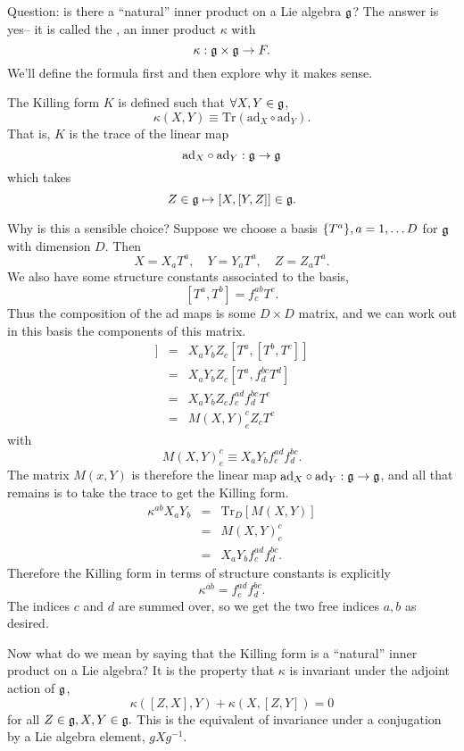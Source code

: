 Question: is there a ``natural'' inner product on a Lie algebra $\mathfrak{g}$? The answer is yes-- it is called the , an inner product $\kappa$ with
$$\kappa:\mathfrak{g} \times \mathfrak{g} \to F.$$
We'll define the formula first and then explore why it makes sense.
\begin{defn}
The Killing form $K$ is defined such that $\forall X,Y \in \mathfrak{g}$,
$$\kappa(X,Y)\equiv \text{Tr}(\text{ad}_X \circ \text{ad}_Y).$$
That is, $K$ is the trace of the linear map
$$\text{ad}_X \circ \text{ad}_Y: \mathfrak{g} \to \mathfrak{g}$$
which takes
$$Z\in \mathfrak{g} \mapsto [X,[Y,Z]] \in \mathfrak{g}.$$
\end{defn}
Why is this a sensible choice? Suppose we choose a basis $\{T^a\},a=1,\ldots D$ for $\mathfrak{g}$ with dimension $D$. Then
$$X=X_a T^a,\quad Y=Y_a T^a, \quad Z=Z_a T^a.$$
We also have some structure constants associated to the basis,
$$[T^a,T^b]=f^{ab}_c T^c.$$
Thus the composition of the ad maps is some $D\times D$ matrix, and we can work out in this basis the components of this matrix.
\begin{eqnarray*}
[X,[Y,Z]]&=&X_a Y_b Z_c [T^a,[T^b,T^c]]\\
&=&X_a Y_b Z_c [T^a,f^{bc}_d T^d]\\
&=& X_a Y_b Z_c f^{ad}_e f^{bc}_d T^e\\
&=&M(X,Y)^c_e Z_c T^e
\end{eqnarray*}
with 
$$M(X,Y)^c_e \equiv X_a Y_b f^{ad}_c f^{bc}_d.$$
The matrix $M(x,Y)$ is therefore the linear map $\text{ad}_X\circ \text{ad}_Y:\mathfrak{g} \to \mathfrak{g}$, and all that remains is to take the trace to get the Killing form.
\begin{eqnarray*}
\kappa^{ab}X_a Y_b &=& \text{Tr}_D[M(X,Y)]\\
&=&M(X,Y)^c_c\\
&=&X_a Y_b f^{ad}_c f^{bc}_d.
\end{eqnarray*}
Therefore the Killing form in terms of structure constants is explicitly
$$\kappa^{ab}=f^{ad}_c f^{bc}_d.$$
The indices $c$ and $d$ are summed over, so we get the two free indices $a,b$ as desired.

Now what do we mean by saying that the Killing form is a ``natural'' inner product on a Lie algebra? It is the property that $\kappa$ is invariant under the adjoint action of $\mathfrak{g}$,
$$\kappa([Z,X],Y)+\kappa(X,[Z,Y])=0$$ for all $Z\in \mathfrak{g}, X,Y \in \mathfrak{g}.$ This is the equivalent of invariance under a conjugation by a Lie algebra element, $g X g^{-1}.$

